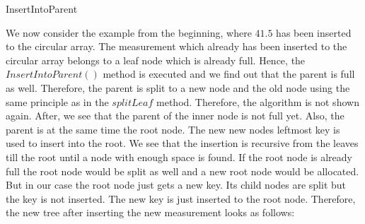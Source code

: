 \documentclass[abstracton,12pt]{scrreprt}
\begin{document}
\begin{algorithm}[H]
	\IncMargin{1em}
	\SetAlgoLined
	\DontPrintSemicolon
	
	
	

	\caption{InsertIntoParent}	\label{InsertIntoParent}
\end{algorithm}


\begin{exmp}
We now consider the example from the beginning, where $41.5$ has been inserted to the circular array. The measurement which already has been inserted to the circular array belongs to a leaf node which is already full. Hence, the $InsertIntoParent()$ method is executed and we find out that the parent is full as well. Therefore, the parent is split to a new node and the old node using the same principle as in the $split Leaf$ method. Therefore, the algorithm is not shown again. After, we see that the parent of the inner node is not full yet. Also, the parent is at the same time the root node. The new new nodes leftmost key is used to insert into the root. We see that the insertion is recursive from the leaves till the root until a node with enough space is found. If the root node is already full the root node would be split as well and a new root node would be allocated. But in our case the root node just gets a new key. Its child nodes are split but the key is not inserted. The new key is just inserted to the root node. Therefore, the new tree after inserting the new measurement looks as follows:  
\end{exmp}
\end{document}
